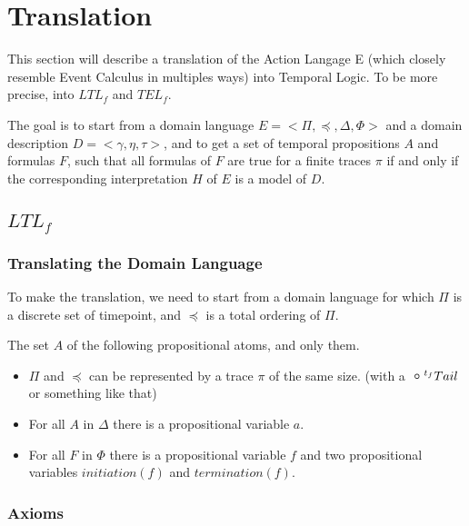 \section{Translation}\label{sec:translation}

This section will describe a translation of the Action Langage E (which closely resemble Event Calculus in multiples ways) into Temporal Logic.
To be more precise, into $LTL_f$ and $TEL_f$.

The goal is to start from a domain language $E=<\Pi,\preceq,\Delta,\Phi>$ and a domain description $D=<\gamma,\eta,\tau>$, and to get a set of temporal propositions $A$ and formulas $F$, such that all formulas of $F$ are true for a finite traces $\pi$ if and only if the corresponding interpretation $H$ of $E$ is a model of $D$.

\subsection{$LTL_f$}

\subsubsection{Translating the Domain Language}

To make the translation, we need to start from a domain language for which $\Pi$ is a discrete set of timepoint, and $\preceq$ is a total ordering of $\Pi$.

The set $A$ of the following propositional atoms, and only them.

\begin{itemize}
  \item $\Pi$ and $\preceq$ can be represented by a trace $\pi$ of the same size. (with a $\next^{t_f}Tail$ or something like that)
  \item For all $A$ in $\Delta$ there is a propositional variable $a$.
  \item For all $F$ in $\Phi$ there is a propositional variable $f$ and two propositional variables $initiation(f)$ and $termination(f)$.
\end{itemize}

\subsubsection{Axioms}

